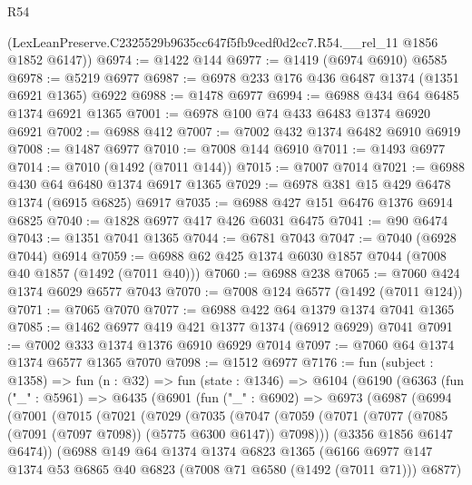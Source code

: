 \begin{lexlean}{R54}
\begin{coremodule}
      (LexLeanPreserve.C2325529b9635cc647f5fb9cedf0d2cc7.R54.__rel_11 @1856 @1852 @6147))
@6974 := @1422 @144
@6977 := @1419 (@6974 @6910) @6585
@6978 := @5219 @6977
@6987 := @6978 @233 @176 @436 @6487 @1374 (@1351 @6921 @1365) @6922
@6988 := @1478 @6977
@6994 := @6988 @434 @64 @6485 @1374 @6921 @1365
@7001 := @6978 @100 @74 @433 @6483 @1374 @6920 @6921
@7002 := @6988 @412
@7007 := @7002 @432 @1374 @6482 @6910 @6919
@7008 := @1487 @6977
@7010 := @7008 @144 @6910
@7011 := @1493 @6977
@7014 := @7010 (@1492 (@7011 @144))
@7015 := @7007 @7014
@7021 := @6988 @430 @64 @6480 @1374 @6917 @1365
@7029 := @6978 @381 @15 @429 @6478 @1374 (@6915 @6825) @6917
@7035 := @6988 @427 @151 @6476 @1376 @6914 @6825
@7040 := @1828 @6977 @417 @426 @6031 @6475
@7041 := @90 @6474
@7043 := @1351 @7041 @1365
@7044 := @6781 @7043
@7047 := @7040 (@6928 @7044) @6914
@7059 := @6988 @62 @425 @1374 @6030 @1857 @7044 (@7008 @40 @1857 (@1492 (@7011 @40)))
@7060 := @6988 @238
@7065 := @7060 @424 @1374 @6029 @6577 @7043
@7070 := @7008 @124 @6577 (@1492 (@7011 @124))
@7071 := @7065 @7070
@7077 := @6988 @422 @64 @1379 @1374 @7041 @1365
@7085 := @1462 @6977 @419 @421 @1377 @1374 (@6912 @6929) @7041
@7091 := @7002 @333 @1374 @1376 @6910 @6929 @7014
@7097 := @7060 @64 @1374 @1374 @6577 @1365 @7070
@7098 := @1512 @6977
@7176 := fun (subject : @1358) =>
  fun (n : @32) =>
  fun (state : @1346) =>
  @6104
    (@6190
      (@6363
        (fun ("_" : @5961) =>
        @6435
          (@6901
            (fun ("_" : @6902) =>
            @6973
              (@6987
                (@6994
                  (@7001
                    (@7015
                      (@7021
                        (@7029
                          (@7035
                            (@7047
                              (@7059
                                (@7071
                                  (@7077 (@7085 (@7091 (@7097 @7098)) (@5775 @6300 @6147)) @7098)))
                              (@3356 @1856 @6147 @6474))
                            (@6988
                              @149
                              @64
                              @1374
                              @1374
                              @6823
                              @1365
                              (@6166
                                @6977
                                @147
                                @1374
                                @53
                                @6865
                                @40
                                @6823
                                (@7008 @71 @6580 (@1492 (@7011 @71)))
                                @6877)

\end{coremodule}
\end{lexlean}
